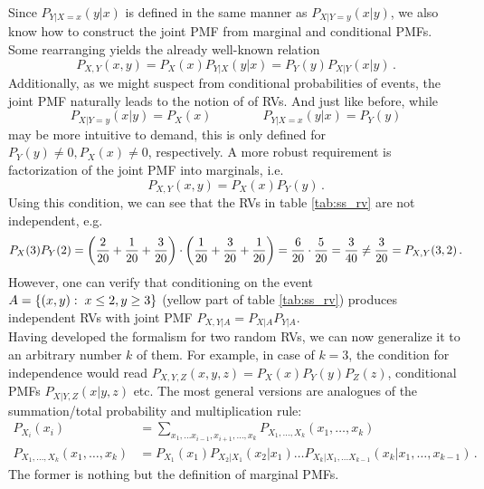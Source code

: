 Since $P_{Y | X = x}(y | x)$ is defined in the same manner as $P_{X | Y = y}(x | y)$, we also know how to construct the joint PMF from marginal and conditional PMFs. Some rearranging yields the already well-known relation
\begin{equation}\label{eq:joint_pmf}
P_{X, Y}(x, y) =  P_X(x) P_{Y | X}(y | x) = P_Y(y) P_{X | Y}(x | y) \, .
\end{equation}
Additionally, as we might suspect from conditional probabilities of events, the joint PMF naturally leads to the notion of  of RVs. And just like before, while
\begin{equation}
P_{X | Y = y}(x | y) = P_X(x) \qquad \qquad P_{Y | X = x}(y | x) = P_Y(y)
\end{equation}
may be more intuitive to demand, this is only defined for $P_Y(y) \neq 0, P_X(x) \neq 0$, respectively. A more robust requirement is factorization of the joint PMF into marginals, i.e.
\begin{equation}
P_{X, Y}(x, y) = P_X(x) P_Y(y) \, .
\end{equation}
Using this condition, we can see that the RVs in table \ref{tab:ss_rv} are not independent, e.g.
\begin{equation*}
P_X(3) P_Y(2) = \qty(\frac{2}{20} + \frac{1}{20} + \frac{3}{20}) \cdot \qty(\frac{1}{20} + \frac{3}{20} + \frac{1}{20}) = \frac{6}{20} \cdot \frac{5}{20} = \frac{3}{40} \neq \frac{3}{20} = P_{X, Y}(3, 2) \, .
\end{equation*}
However, one can verify that conditioning on the event $A = \qty{(x, y): \; x \leq 2, y \geq 3}$ (yellow part of table \ref{tab:ss_rv}) produces independent RVs with joint PMF $P_{X, Y | A} = P_{X | A} P_{Y | A}$.\\


Having developed the formalism for two random RVs, we can now generalize it to an arbitrary number $k$ of them. For example, in case of $k = 3$, the condition for independence would read $P_{X, Y, Z}(x, y, z) = P_X(x) P_Y(y) P_Z(z)$, conditional PMFs $P_{X | Y, Z}(x | y, z)$ etc. The most general versions are analogues of the summation/total probability and multiplication rule:
\begin{align}
P_{X_i}(x_i) &= \sum_{x_1, \dots x_{i - 1}, x_{i + 1}, \dots, x_k} P_{X_1, \dots, X_k}(x_1, \dots, x_k)
\\
P_{X_1, \dots, X_k}(x_1, \dots, x_k) &= P_{X_1}(x_1) P_{X_2 | X_1}(x_2 | x_1) \dots P_{X_k | X_1, \dots X_{k - 1}}(x_k | x_1, \dots, x_{k - 1}) \, .
\end{align}
The former is nothing but the definition of marginal PMFs.



